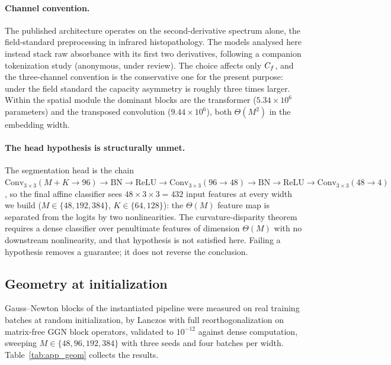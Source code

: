 \paragraph{Channel convention.} The published architecture operates on the
second-derivative spectrum alone, the field-standard preprocessing in infrared
histopathology. The models analysed here instead stack raw absorbance with its
first two derivatives, following a companion tokenization study (anonymous,
under review). The choice affects only $C_f$, and the three-channel convention
is the conservative one for the present purpose: under the field standard the
capacity asymmetry is roughly three times larger. Within the spatial module the
dominant blocks are the transformer ($5.34 \times 10^6$ parameters) and the
transposed convolution ($9.44 \times 10^6$), both $\Theta(M^2)$ in the
embedding width.

\paragraph{The head hypothesis is structurally unmet.} The segmentation head is
the chain $\mathrm{Conv}_{3\times3}(M{+}K \to 96) \to \mathrm{BN} \to
\mathrm{ReLU} \to \mathrm{Conv}_{3\times3}(96 \to 48) \to \mathrm{BN} \to
\mathrm{ReLU} \to \mathrm{Conv}_{3\times3}(48 \to 4)$, so the final affine
classifier sees $48 \times 3 \times 3 = 432$ input features at every width we
build ($M \in \{48, 192, 384\}$, $K \in \{64, 128\}$): the $\Theta(M)$ feature
map is separated from the logits by two nonlinearities. The
curvature-disparity theorem requires a dense classifier over penultimate
features of dimension $\Theta(M)$ with no downstream nonlinearity, and that
hypothesis is not satisfied here. Failing a hypothesis removes a guarantee; it
does not reverse the conclusion.

\subsection{Geometry at initialization}
\label{app:prod_geometry}

Gauss--Newton blocks of the instantiated pipeline were measured on real
training batches at random initialization, by Lanczos with full
reorthogonalization on matrix-free GGN block operators, validated to $10^{-12}$
against dense computation, sweeping $M \in \{48, 96, 192, 384\}$ with three
seeds and four batches per width. Table~\ref{tab:app_geom} collects the
results.

